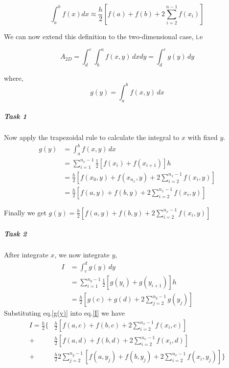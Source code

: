 \documentclass[
	12pt, %
]{fphw}
\numberwithin{equation}{section}
\numberwithin{figure}{section}
\numberwithin{table}{section}
\begin{document}
\begin{equation}
	\int^{b}_{a}f(x)dx\approx \frac{h}{2}[f(a) + f(b) + 2\sum^{n-1}_{i=2}f(x_i)]
\end{equation}

We can now extend this definition to the two-dimensional case, i.e

\begin{equation}
	A_{2D}=\int^{c}_{d}\int^{a}_{b}f(x, y)\, dxdy = \int^{c}_{d}g(y)\, dy
\end{equation}

where, 
\begin{equation}
	g(y) = \int^{b}_{a}f(x,y)\,dx 
\end{equation}

\subparagraph*{Task 1}
Now apply the trapezoidal rule to calculate the integral to $x$ with fixed $y$.
\begin{equation} \label{g(y)}
	\begin{aligned}
		g(y) & = \int^{b}_{a}f(x,y)\,dx                                                 \\
		     & = \sum^{n_x-1}_{i=1}\frac{1}{2}[f(x_i)+f(x_{i+1})]h                      \\
		     & = \frac{h}{2} [f(x_0, y) + f(x_{n_x}, y) + 2\sum^{n_x-1}_{i=2}f(x_i, y)] \\
		     & = \frac{h}{2} [f(a, y) + f(b, y) + 2\sum^{n_x-1}_{i=2}f(x_i, y)]
	\end{aligned}
\end{equation}

Finally we get $g(y)=\frac{h}{2} [f(a, y) + f(b, y) + 2\sum^{n_x-1}_{i=2}f(x_i, y)]$

\subparagraph*{Task 2}
After integrate $x$, we now integrate $y$,
\begin{equation} \label{I}
	\begin{aligned}
		I & = \int^{d}_{c}g(y)\,dy                                  \\
		  & = \sum^{n_y-1}_{i=1}\frac{1}{2} [g(y_i)+g(y_{i+1})]h    \\
		  & = \frac{h}{2} [g(c) + g(d) + 2\sum^{n_y-1}_{j=2}g(y_j)]
	\end{aligned}
\end{equation}
Substituting eq.\eqref{g(y)} into  eq.\eqref{I} we have
\begin{equation}
	\begin{aligned} \label{substitutedI}
		I = \frac{h}{2}\{ & \frac{h}{2}[f(a, c) + f(b, c) + 2\sum^{n_x-1}_{i=2}f(x_i, c)]                            \\
		+                 & \frac{h}{2}[f(a, d) + f(b, d) + 2\sum^{n_x-1}_{i=2}f(x_i, d)]                            \\
		+                 & \frac{h}{2}2\sum^{n_y-1}_{j=2}[f(a, y_j) + f(b, y_j) + 2\sum^{n_x-1}_{i=2}f(x_i, y_j)]\}
	\end{aligned}
\end{equation}
\end{document}
